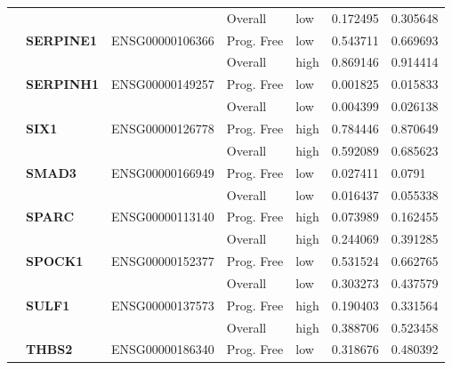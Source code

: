 \begin{spacing}{1}
{\begin{longtable}{|>{\bfseries}p{2cm}|>{\bfseries}p{1.9cm}|p{2.8cm}|p{2cm}|p{2cm}|p{1.5cm}|p{1.5cm}|}
            \hhline{~~~----}
             &          &                 & Overall    & low  & 0.172495 & 0.305648                \\
            \hhline{~======}
             & SERPINE1 & ENSG00000106366 & Prog. Free & low  & 0.543711 & 0.669693                \\
            \hhline{~~~----}
             &          &                 & Overall    & high & 0.869146 & 0.914414                \\
            \hhline{~======}
             & SERPINH1 & ENSG00000149257 & Prog. Free & low  & 0.001825 & 0.015833                \\
            \hhline{~~~----}
             &          &                 & Overall    & low  & 0.004399 & 0.026138                \\
            \hhline{~======}
             & SIX1     & ENSG00000126778 & Prog. Free & high & 0.784446 & 0.870649                \\
            \hhline{~~~----}
             &          &                 & Overall    & high & 0.592089 & 0.685623                \\
            \hhline{~======}
             & SMAD3    & ENSG00000166949 & Prog. Free & low  & 0.027411 & 0.0791                  \\
            \hhline{~~~----}
             &          &                 & Overall    & low  & 0.016437 & 0.055338                \\
            \hhline{~======}
             & SPARC    & ENSG00000113140 & Prog. Free & high & 0.073989 & 0.162455                \\
            \hhline{~~~----}
             &          &                 & Overall    & high & 0.244069 & 0.391285                \\
            \hhline{~======}
             & SPOCK1   & ENSG00000152377 & Prog. Free & low  & 0.531524 & 0.662765                \\
            \hhline{~~~----}
             &          &                 & Overall    & low  & 0.303273 & 0.437579                \\
            \hhline{~======}
             & SULF1    & ENSG00000137573 & Prog. Free & high & 0.190403 & 0.331564                \\
            \hhline{~~~----}
             &          &                 & Overall    & high & 0.388706 & 0.523458                \\
            \hhline{~======}
             & THBS2    & ENSG00000186340 & Prog. Free & low  & 0.318676 & 0.480392                \\

\end{longtable}}
\end{spacing}
